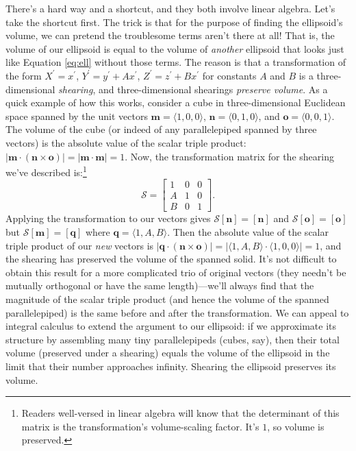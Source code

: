 \documentclass[12pt]{article}
\renewcommand{\vv}[1]{\mathbf{#1}}
\begin{document}
There's a hard way and a shortcut, and they both involve linear algebra. Let's take the shortcut first. The trick is that for the purpose of finding the ellipsoid's volume, we can pretend the troublesome terms aren't there at all! That is, the volume of our ellipsoid is equal to the volume of \emph{another} ellipsoid that looks just like Equation \ref{eq:ell} without those terms. The reason is that a transformation of the form $X^\prime = x^\prime$, $Y^\prime = y^\prime + A x^\prime$, $Z^\prime = z^\prime + B x^\prime$ for constants $A$ and $B$ is a three-dimensional \emph{shearing}, and three-dimensional shearings \emph{preserve volume}. As a quick example of how this works, consider a cube in three-dimensional Euclidean space spanned by the unit vectors $\vv m = \langle 1, 0, 0 \rangle$, $\vv n = \langle 0, 1, 0 \rangle$, and $\vv o = \langle 0, 0, 1 \rangle$. The volume of the cube (or indeed of any parallelepiped spanned by three vectors) is the absolute value of the scalar triple product: $| \vv m \cdot (\vv n \times \vv o ) | = | \vv m \cdot \vv m | = 1$. Now, the transformation matrix for the shearing we've described is:\footnote{Readers well-versed in linear algebra will know that the determinant of this matrix is the transformation's volume-scaling factor. It's $1$, so volume is preserved.}
\begin{equation*}
\mathcal{S} =
\begin{bmatrix}
1 & 0 & 0 \\
A & 1 & 0 \\
B & 0 & 1
\end{bmatrix}.
\end{equation*}
Applying the transformation to our vectors gives $\mathcal{S} [\vv n] = [\vv n]$ and $\mathcal{S} [\vv o] = [\vv o]$ but $\mathcal{S} [\vv m] = [ \vv q ]$ where $\vv q = \langle 1, A, B \rangle$. Then the absolute value of the scalar triple product of our \emph{new} vectors is ${| \vv q \cdot (\vv n \times \vv o) | = | \langle 1, A, B \rangle \cdot \langle 1, 0, 0 \rangle | = 1}$, and the shearing has preserved the volume of the spanned solid. It's not difficult to obtain this result for a more complicated trio of original vectors (they needn't be mutually orthogonal or have the same length)---we'll always find that the magnitude of the scalar triple product (and hence the volume of the spanned parallelepiped) is the same before and after the transformation. We can appeal to integral calculus to extend the argument to our ellipsoid: if we approximate its structure by assembling many tiny parallelepipeds (cubes, say), then their total volume (preserved under a shearing) equals the volume of the ellipsoid in the limit that their number approaches infinity. Shearing the ellipsoid preserves its volume.
\end{document}
